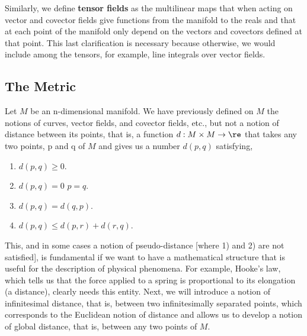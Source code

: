 Similarly, we define {\bf tensor fields} as the multilinear maps
that when acting on vector and covector fields give functions
from the manifold to the reals and that at each point of the manifold only 
depend on the vectors and covectors defined at that point. 
This last clarification is
necessary because otherwise, we would include among the tensors, for
example, line integrals over vector fields.
 

\subsection{The Metric}


Let $M$ be an n-dimensional manifold. We have previously defined on $M$
the notions of curves, vector fields, and covector fields, etc., but
not a notion of distance between its points, that is, a function 
$d: M \times M \rightarrow \re$ that takes any two points, p and q of
$M$ and gives us a number $d(p,q)$ satisfying,
\begin{enumerate}
\item $d(p,q) \geq 0$.
\item $d(p,q) = 0 $ \sii $p=q$.
\item $d(p,q) = d(q,p)$.
\item $d(p,q) \leq d(p,r) + d(r,q)$.
\end{enumerate}
 
This, and in some cases a notion of pseudo-distance [where 1) and
2) are not satisfied], is fundamental if we want to have a mathematical structure 
that is useful for the description of physical phenomena. 
For example,
Hooke's law, which tells us that the force applied to
a spring is proportional to its elongation (a distance),
clearly needs this entity.
Next, we will introduce a notion of infinitesimal distance,
that is, between two infinitesimally separated points, which corresponds
to the Euclidean notion of distance and allows us to develop a notion of
global distance, that is, between any two points of $M$.

